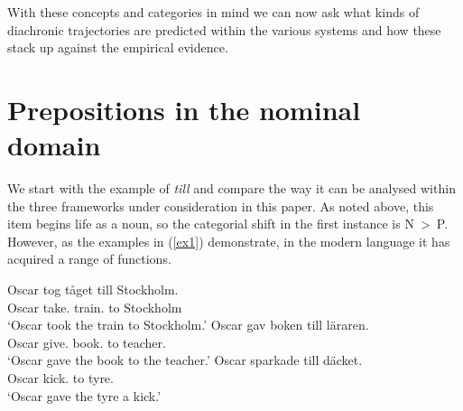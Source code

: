 \documentclass[output=paper]{langsci/langscibook}
\begin{document}
\begin{table}\small
\caption{Heads in \gls{LFG} and \gls{HPSG}\label{Fig3CatsLFGHPSG}}
\end{table}

With these concepts and categories in mind we can now ask what kinds of
diachronic trajectories are predicted within the various systems and how these
stack up against the empirical evidence.

\section{Prepositions in the nominal domain}

We start with the example of  \emph{till} and compare the way it
can be analysed within the three frameworks under consideration in this paper.
As noted above, this item begins life as a noun, so the categorial shift in the
first instance is N~>~P. However, as the examples in (\ref{ex1}) demonstrate,
in the modern language it has acquired a range of functions.

\begin{exe}
\ex\label{ex1} 
\begin{xlist}
\ex\label{ex1a}
\gll Oscar tog t\aa get till Stockholm.\\
	Oscar take.\Pst{} train.\Def{} to Stockholm\\
\trans \enquote*{Oscar took the train to Stockholm.}
\ex\label{ex1b}
\gll Oscar gav boken till l\"araren.\\
	Oscar give.\Pst{} book.\Def{} to teacher.\Def{}\\
\trans \enquote*{Oscar gave the book to the teacher.}
\ex\label{ex1c}
\gll Oscar sparkade till d\"acket.\\
	Oscar kick.\Pst{} to tyre.\Def{}\\
\trans \enquote*{Oscar gave the tyre a kick.}
\end{xlist}
\end{exe}
\end{document}
